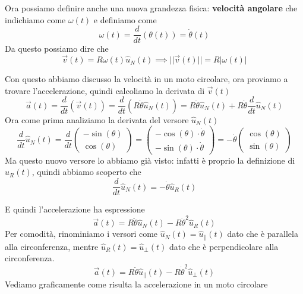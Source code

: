 \documentclass{rapport}
\begin{document}
Ora possiamo definire anche una nuova grandezza fisica: \textbf{velocità angolare} che indichiamo come $\omega(t)$ e definiamo come
\[
\omega(t) = \dfrac{d}{dt}(\theta(t)) = \dot{\theta}(t)
\]
Da questo possiamo dire che 
\[
\vec{v}(t) =  R\omega(t) \hat{u}_N(t) \implies ||\vec{v}(t)|| = R|\omega(t)|
\]

Con questo abbiamo discusso la velocità in un moto circolare, ora proviamo a trovare l'accelerazione, quindi calcoliamo la derivata di $\vec{v}(t)$
\[
\vec{a}(t) = \dfrac{d}{dt}(\vec{v}(t)) = \dfrac{d}{dt} (R \dot{\theta} \hat{u}_N(t)) = R\ddot{\theta} \hat{u}_N(t) + R\dot{\theta} \dfrac{d}{dt}\hat{u}_N(t)
\]
Ora come prima analiziamo la derivata del versore $\hat{u}_N(t)$
\[
\dfrac{d}{dt}\hat{u}_N(t)=\dfrac{d}{dt} \begin{pmatrix}
  -\sin(\theta)\\
\cos(\theta)
\end{pmatrix} = \begin{pmatrix}
  -\cos(\theta)\cdot \dot\theta\\
-\sin(\theta)\cdot \dot\theta
\end{pmatrix} = -\dot\theta\begin{pmatrix}
  \cos(\theta) \\
\sin(\theta)
\end{pmatrix} 
\]
Ma questo nuovo versore lo abbiamo già visto: infatti è proprio la definizione di $\hat{u}_R(t)$, quindi abbiamo scoperto che 
\[
\dfrac{d}{dt}\hat{u}_N(t) = -\dot\theta\hat{u}_R(t)
\]

E quindi l'accelerazione ha espressione 
\[
\vec{a}(t) =R\ddot{\theta} \hat{u}_N(t) - R\dot{\theta}^2\hat{u}_R(t)
\]
Per comodità, rinominiamo i versori come $\hat{u}_N(t)=\hat{u}_\parallel(t)$ dato che è parallela alla circonferenza, mentre $\hat{u}_R(t)=\hat{u}_\perp(t)$ dato che è perpendicolare alla circonferenza.
\[
\vec{a}(t) =R\ddot{\theta} \hat{u}_\parallel(t) - R\dot{\theta}^2\hat{u}_\perp(t)
\]
Vediamo graficamente come risulta la accelerazione in un moto circolare
\end{document}
